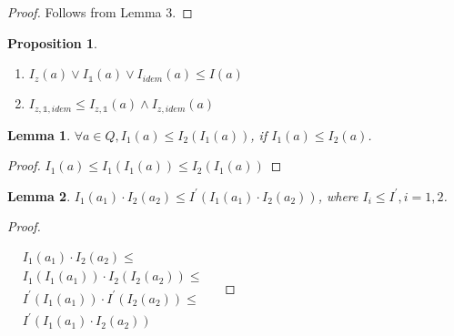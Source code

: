 \documentclass[a4paper]{article}
\newtheorem{prop}{Proposition}
\newtheorem{lemma}{Lemma}
\begin{document}
\begin{proof}
  Follows from Lemma 3.
\end{proof}

\begin{prop}
$ $

\begin{enumerate}
  \item $I_z (a) \vee I_{\mathds{1}} (a) \vee I_{idem} (a) \leq I(a)$
  \item $I_{z, \mathds{1}, idem} \leq I_{z, \mathds{1}} (a) \wedge I_{z, idem} (a)$
\end{enumerate}
\end{prop}

\begin{lemma}
  $\forall a \in Q, I_1 (a) \leq I_2 (I_1 (a))$, if $I_1 (a) \leq I_2 (a)$.
\end{lemma}

\begin{proof}
  $I_1 (a) \leq I_1 (I_1 (a)) \leq I_2 (I_1 (a))$
\end{proof}

\begin{lemma}
  $I_1(a_1) \cdot I_2(a_2) \leq I^{'} (I_1(a_1) \cdot I_2(a_2))$, where $I_i \leq I^{'}, i = 1,2$.
\end{lemma}

\begin{proof}
$ $

  $\begin{array}{lll}
  &I_1(a_1) \cdot I_2(a_2) \leq & \\
  &I_1 (I_1 (a_1)) \cdot I_2 (I_2 (a_2)) \leq & \\
  &I^{'} (I_1 (a_1)) \cdot I^{'} (I_2 (a_2)) \leq & \\
  &I^{'}(I_1 (a_1) \cdot I_2 (a_2))&
  \end{array}$
\end{proof}
\end{document}
